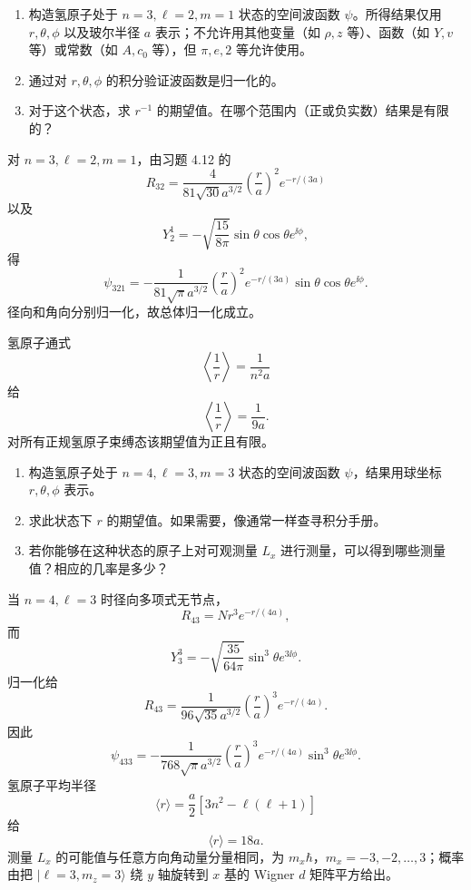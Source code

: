 \begin{question}
\begin{enumerate}
\item 构造氢原子处于 $n=3,\ell=2,m=1$ 状态的空间波函数 $\psi$。所得结果仅用 $r,\theta,\phi$ 以及玻尔半径 $a$ 表示；不允许用其他变量（如 $\rho,z$ 等）、函数（如 $Y,v$ 等）或常数（如 $A,c_0$ 等），但 $\pi,e,2$ 等允许使用。
\item 通过对 $r,\theta,\phi$ 的积分验证波函数是归一化的。
\item 对于这个状态，求 $r^{-1}$ 的期望值。在哪个范围内（正或负实数）结果是有限的？
\end{enumerate}
\end{question}
\begin{solution}

对 $n=3,\ell=2,m=1$，由习题 4.12 的
\[
R_{32}=\frac{4}{81\sqrt{30}a^{3/2}}\left(\frac{r}{a}\right)^2e^{-r/(3a)}
\]
以及
\[
Y_2^1=-\sqrt{\frac{15}{8\pi}}\sin\theta\cos\theta e^{\ii\phi},
\]
得
\[
\psi_{321}=-\frac{1}{81\sqrt{\pi}a^{3/2}}\left(\frac{r}{a}\right)^2e^{-r/(3a)}\sin\theta\cos\theta e^{\ii\phi}.
\]
径向和角向分别归一化，故总体归一化成立。

氢原子通式
\[
\left\langle\frac1r\right\rangle=\frac{1}{n^2a}
\]
给
\[
\left\langle\frac1r\right\rangle=\frac{1}{9a}.
\]
对所有正规氢原子束缚态该期望值为正且有限。

\end{solution}

\begin{question}
\begin{enumerate}
\item 构造氢原子处于 $n=4,\ell=3,m=3$ 状态的空间波函数 $\psi$，结果用球坐标 $r,\theta,\phi$ 表示。
\item 求此状态下 $r$ 的期望值。如果需要，像通常一样查寻积分手册。
\item 若你能够在这种状态的原子上对可观测量 $L_x$ 进行测量，可以得到哪些测量值？相应的几率是多少？
\end{enumerate}
\end{question}
\begin{solution}

当 $n=4,\ell=3$ 时径向多项式无节点，
\[
R_{43}=N r^3e^{-r/(4a)},
\]
而
\[
Y_3^3=-\sqrt{\frac{35}{64\pi}}\sin^3\theta e^{3\ii\phi}.
\]
归一化给
\[
R_{43}=\frac{1}{96\sqrt{35}a^{3/2}}\left(\frac{r}{a}\right)^3e^{-r/(4a)}.
\]
因此
\[
\psi_{433}=-\frac{1}{768\sqrt\pi a^{3/2}}\left(\frac{r}{a}\right)^3e^{-r/(4a)}\sin^3\theta e^{3\ii\phi}.
\]
氢原子平均半径
\[
\langle r\rangle=\frac{a}{2}[3n^2-\ell(\ell+1)]
\]
给
\[
\langle r\rangle=18a.
\]
测量 $L_x$ 的可能值与任意方向角动量分量相同，为 $m_x\hbar$，$m_x=-3,-2,\ldots,3$；概率由把 $|\ell=3,m_z=3\rangle$ 绕 $y$ 轴旋转到 $x$ 基的 Wigner $d$ 矩阵平方给出。

\end{solution}

